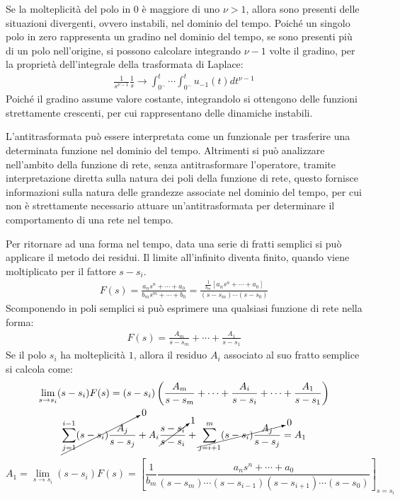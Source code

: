 \documentclass{article}
\numberwithin{equation}{subsection}
\begin{document}
Se la molteplicità del polo in $0$ è maggiore di uno $\nu>1$, allora sono presenti delle situazioni divergenti, ovvero instabili, nel dominio del tempo. Poiché un singolo 
polo in zero rappresenta un gradino nel dominio del tempo, se sono presenti più di un polo nell'origine, si possono calcolare integrando $\nu-1$ volte il gradino, per la 
proprietà dell'integrale della trasformata di Laplace:
\begin{gather*}
    \displaystyle\frac{1}{s^{\nu-1}}\frac{1}{s}\to\int_{0^-}^t\cdots\int_{0^-}^tu_{-1}(t)dt^{\nu-1}
\end{gather*}
Poiché il gradino assume valore costante, integrandolo si ottengono delle funzioni strettamente crescenti, per cui rappresentano delle dinamiche instabili. 


L'antitrasformata può essere interpretata come un funzionale per trasferire una determinata funzione nel dominio del tempo. Altrimenti si può analizzare nell'ambito della 
funzione di rete, senza antitrasformare l'operatore, tramite interpretazione diretta sulla natura dei poli della funzione di rete, questo fornisce informazioni sulla 
natura delle grandezze associate nel dominio del tempo, per cui non è strettamente necessario attuare un'antitrasformata per determinare il comportamento di una rete 
nel tempo. 

Per ritornare ad una forma nel tempo, data una serie di fratti semplici si può applicare il metodo dei residui. 
Il limite all'infinito diventa finito, quando viene moltiplicato per il fattore $s-s_i$. %
\begin{gather*}
    F(s)=\displaystyle\frac{a_ns^n+\cdots+a_0}{b_ms^m+\cdots+b_0}=\frac{\displaystyle\frac{1}{b_m}\left[a_ns^n+\cdots+a_0\right]}{(s-s_m)\cdots(s-s_0)}
\end{gather*}
Scomponendo in poli semplici si può esprimere una qualsiasi funzione di rete nella forma:
\begin{gather*}
    F(s)=\displaystyle\frac{A_m}{s-s_m}+\cdots+\frac{A_1}{s-s_1}
\end{gather*}
Se il polo $s_i$ ha molteplicità $1$, allora il residuo $A_i$ associato al suo fratto semplice si calcola come:
\begin{gather*}
    \lim_{s\to s_i}(s-s_i)F(s)=(s-s_i)\left(\displaystyle\frac{A_m}{s-s_m}+\cdots+\frac{A_i}{s-s_i}+\cdots+\frac{A_1}{s-s_1}\right)\\
    \displaystyle\cancelto{0}{\sum_{j=1}^{i-1}(s-s_i)\frac{A_j}{s-s_j}}+A_i\cancelto{1}{\frac{s-s_i}{s-s_i}}+\cancelto{0}{\sum_{j=i+1}^{m}(s-s_i)\frac{A_j}{s-s_j}}=A_1
\end{gather*}
\begin{equation}
    A_1=\lim_{s\to s_i}(s-s_i)F(s)=\left[\displaystyle\frac{1}{b_m}\frac{a_ns^n+\cdots+a_0}{(s-s_m)\cdots(s-s_{i-1})(s-s_{i+1})\cdots(s-s_0)}\right]_{s=s_i}
\end{equation}
\end{document}
